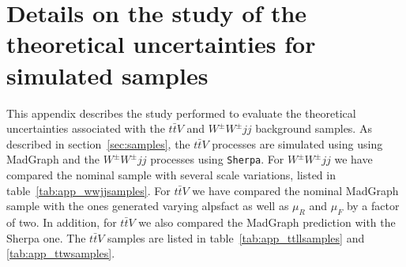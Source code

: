 
\clearpage 
\section{Details on the study of the theoretical uncertainties for simulated samples}
\label{appendix_ttVsystematic}

This appendix describes the study performed to evaluate the
theoretical uncertainties associated with the $t\bar{t}V$ and
$W^\pm{}W^\pm{}jj$ background samples. As described in
section~\ref{sec:samples}, the $t\bar{t}V$ processes are simulated
using using {\sc MadGraph} and the $W^\pm{}W^\pm{}jj$ processes using
\texttt{Sherpa}. For $W^\pm{}W^\pm{}jj$ we have compared the nominal
sample with several scale variations, listed in
table~\ref{tab:app_wwjjsamples}. For $t\bar{t}V$ we have compared the
nominal {\sc MadGraph} sample with the ones generated varying {\sc
  alpsfact} as well as $\mu_R$ and $\mu_F$ by a factor of two. In
addition, for $t\bar{t}V$ we also compared the {\sc MadGraph}
prediction with the {\sc Sherpa} one. The $t\bar{t}V$ samples are
listed in table~\ref{tab:app_ttllsamples} and
\ref{tab:app_ttwsamples}.
%
%

